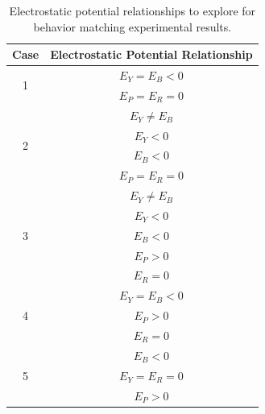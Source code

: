 \documentclass[../../AdvancementSummary.tex]{subfiles}
\begin{document}
\begin{table}[H]
\caption{Electrostatic potential relationships to explore for behavior matching experimental results. \label{table: ElecPotentialRelationships}}
\begin{center}
\begin{tabular}{| c | c |}
\hline
Case & Electrostatic Potential Relationship \\
\hline
\multicolumn{1}{|c|}{\multirow{2}[0]{*}{1}}  &  $E_Y = E_B < 0$\\
							&	   $E_P = E_R = 0 $\\
\hline
\multicolumn{1}{|c|}{\multirow{4}[0]{*}{2}}  &  $E_Y \neq E_B $\\
							&	   $E_Y < 0$ \\
							&	   $E_B < 0$ \\
							&	  $E_P = E_R = 0 $\\
\hline
\multicolumn{1}{|c|}{\multirow{5}[0]{*}{3}} 	& $E_Y \neq E_B$\\
							        & $E_Y < 0$ \\
								& $E_B < 0$ \\
								& $E_P > 0 $\\
								& $E_R = 0 $\\
\hline
\multicolumn{1}{|c|}{\multirow{3}[0]{*}{4}} 	& $E_Y = E_B <0 $\\
								& $E_P > 0 $\\
								& $E_R = 0 $\\
\hline
\multicolumn{1}{|c|}{\multirow{3}[0]{*}{5}} 	& $E_B <0 $\\
								& $E_Y = E_R=0 $\\
								& $E_P > 0 $\\
\hline
\end{tabular}
\end{center}
\end{table}					



\end{document}
